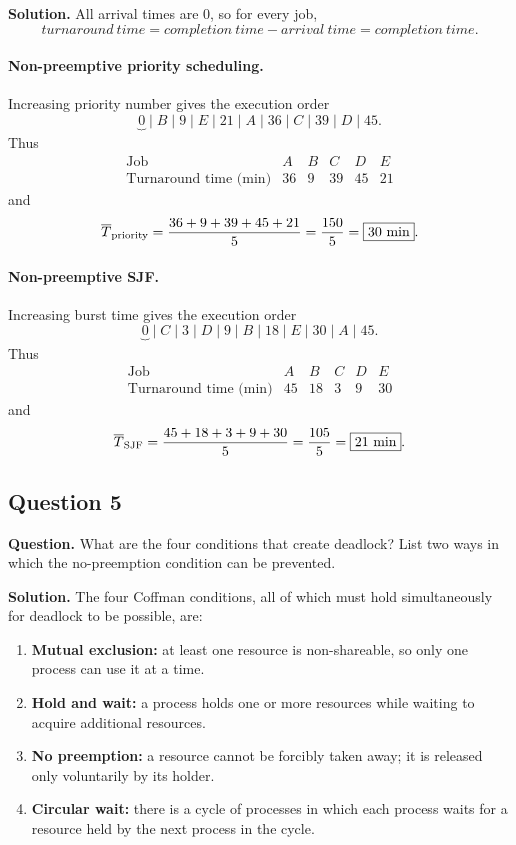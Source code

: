 \textbf{Solution.}
All arrival times are \(0\), so for every job,
\[
  \mathit{turnaround\ time}
  =\mathit{completion\ time}-\mathit{arrival\ time}
  =\mathit{completion\ time}.
\]

\paragraph{Non-preemptive priority scheduling.}
Increasing priority number gives the execution order
\[
 \underbrace{0}_{}
 \;|\;B\;|\;9\;|\;E\;|\;21\;|\;A\;|\;36\;|\;C\;|\;39\;|\;D\;|\;45.
\]
Thus
\[
\begin{array}{c|ccccc}
\text{Job} & A&B&C&D&E\\ \hline
\text{Turnaround time (min)}&36&9&39&45&21
\end{array}
\]
and
\[
 \overline{T}_{\rm priority}
 =\frac{36+9+39+45+21}{5}
 =\frac{150}{5}
 =\boxed{30\text{ min}}.
\]

\paragraph{Non-preemptive SJF.}
Increasing burst time gives the execution order
\[
 \underbrace{0}_{}
 \;|\;C\;|\;3\;|\;D\;|\;9\;|\;B\;|\;18\;|\;E\;|\;30\;|\;A\;|\;45.
\]
Thus
\[
\begin{array}{c|ccccc}
\text{Job} & A&B&C&D&E\\ \hline
\text{Turnaround time (min)}&45&18&3&9&30
\end{array}
\]
and
\[
 \overline{T}_{\rm SJF}
 =\frac{45+18+3+9+30}{5}
 =\frac{105}{5}
 =\boxed{21\text{ min}}.
\]

\subsection*{Question 5}
\textbf{Question.}
What are the four conditions that create deadlock?  List two ways in
which the no-preemption condition can be prevented.

\textbf{Solution.}
The four Coffman conditions, all of which must hold simultaneously for
deadlock to be possible, are:
\begin{enumerate}
 \item \textbf{Mutual exclusion:} at least one resource is
       non-shareable, so only one process can use it at a time.
 \item \textbf{Hold and wait:} a process holds one or more resources
       while waiting to acquire additional resources.
 \item \textbf{No preemption:} a resource cannot be forcibly taken
       away; it is released only voluntarily by its holder.
 \item \textbf{Circular wait:} there is a cycle of processes in which
       each process waits for a resource held by the next process in
       the cycle.
\end{enumerate}

